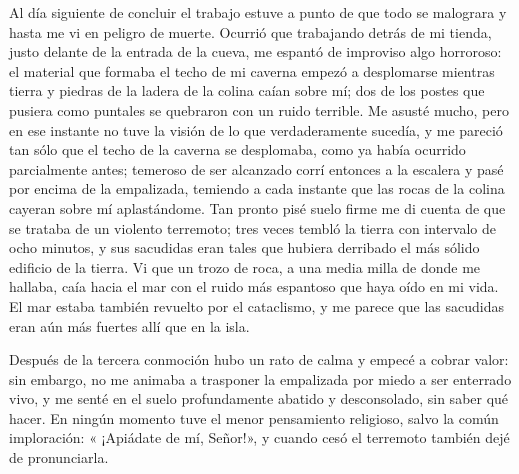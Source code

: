 \documentclass{novela}
\begin{document}
    Al día siguiente de concluir el trabajo estuve a punto de que todo se malograra y hasta me vi en peligro de muerte. Ocurrió que trabajando detrás de mi tienda, justo delante de la entrada de la cueva, me espantó de improviso algo horroroso: el material que formaba el techo de mi caverna empezó a desplomarse mientras tierra y piedras de la ladera de la colina caían sobre mí; dos de los postes que pusiera como puntales se quebraron con un ruido terrible. Me asusté mucho, pero en ese instante no tuve la visión de lo que verdaderamente sucedía, y me pareció tan sólo que el techo de la caverna se desplomaba, como ya había ocurrido parcialmente antes; temeroso de ser alcanzado corrí entonces a la escalera y pasé por encima de la empalizada, temiendo a cada instante que las rocas de la colina cayeran sobre mí aplastándome. Tan pronto pisé suelo firme me di cuenta de que se trataba de un violento terremoto; tres veces tembló la tierra con intervalo de ocho minutos, y sus sacudidas eran tales que hubiera derribado el más sólido edificio de la tierra. Vi que un trozo de roca, a una media milla de donde me hallaba, caía hacia el mar con el ruido más espantoso que haya oído en mi vida. El mar estaba también revuelto por el cataclismo, y me parece que las sacudidas eran aún más fuertes allí que en la isla.


    Después de la tercera conmoción hubo un rato de calma y empecé a cobrar valor: sin embargo, no me animaba a trasponer la empalizada por miedo a ser enterrado vivo, y me senté en el suelo profundamente abatido y desconsolado, sin saber qué hacer. En ningún momento tuve el menor pensamiento religioso, salvo la común imploración: « ¡Apiádate de mí, Señor!», y cuando cesó el terremoto también dejé de pronunciarla.
\end{document}
